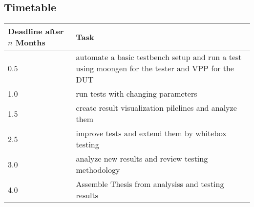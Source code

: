 \documentclass[NET,a4,12pt,ngerman]{netforms}
\begin{document}
\subsection*{Timetable}

\begin{tabular}{|l|p{10cm}|}
\hline
Deadline after $n$ Months & Task \\ \hline
0.5 & automate a basic testbench setup and run a test using moongen for
the tester and VPP for the DUT \\ \hline
1.0 & run tests with changing parameters \\ \hline
1.5 & create result visualization pilelines and analyze them \\ \hline
2.5 & improve tests and extend them by whitebox testing \\ \hline
3.0 & analyze new results and review testing methodology \\ \hline
4.0 & Assemble Thesis from analysiss and testing results \\ \hline
\end{tabular}



\end{document}
